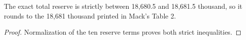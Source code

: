 \begin{theorem}\label{thm:taylorAsheReserve}\leanok
{}
The exact total reserve is strictly between 18,680.5 and 18,681.5 thousand,
so it rounds to the 18,681 thousand printed in Mack's Table 2.
\end{theorem}
\begin{proof}\leanok Normalization of the ten reserve terms proves both strict inequalities. \end{proof}
